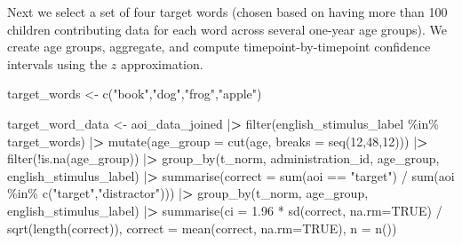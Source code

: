 \documentclass[
  english,
  man,floatsintext]{apa6}
\newenvironment{Shaded}{\begin{snugshade}}{\end{snugshade}}
\newcommand{\AttributeTok}[1]{\textcolor[rgb]{0.77,0.63,0.00}{#1}}
\newcommand{\ConstantTok}[1]{\textcolor[rgb]{0.00,0.00,0.00}{#1}}
\newcommand{\DecValTok}[1]{\textcolor[rgb]{0.00,0.00,0.81}{#1}}
\newcommand{\ErrorTok}[1]{\textcolor[rgb]{0.64,0.00,0.00}{\textbf{#1}}}
\newcommand{\FloatTok}[1]{\textcolor[rgb]{0.00,0.00,0.81}{#1}}
\newcommand{\FunctionTok}[1]{\textcolor[rgb]{0.00,0.00,0.00}{#1}}
\newcommand{\NormalTok}[1]{#1}
\newcommand{\OtherTok}[1]{\textcolor[rgb]{0.56,0.35,0.01}{#1}}
\newcommand{\SpecialCharTok}[1]{\textcolor[rgb]{0.00,0.00,0.00}{#1}}
\newcommand{\StringTok}[1]{\textcolor[rgb]{0.31,0.60,0.02}{#1}}
\begin{document}
Next we select a set of four target words (chosen based on having more than 100 children contributing data for each word across several one-year age groups).
We create age groups, aggregate, and compute timepoint-by-timepoint confidence intervals using the \(z\) approximation.

\begin{Shaded}
\begin{Highlighting}[]
\NormalTok{target\_words }\OtherTok{\textless{}{-}} \FunctionTok{c}\NormalTok{(}\StringTok{"book"}\NormalTok{,}\StringTok{"dog"}\NormalTok{,}\StringTok{"frog"}\NormalTok{,}\StringTok{"apple"}\NormalTok{)}

\NormalTok{target\_word\_data }\OtherTok{\textless{}{-}}\NormalTok{ aoi\_data\_joined }\SpecialCharTok{|}\ErrorTok{\textgreater{}}
  \FunctionTok{filter}\NormalTok{(english\_stimulus\_label }\SpecialCharTok{\%in\%}\NormalTok{ target\_words) }\SpecialCharTok{|}\ErrorTok{\textgreater{}}
  \FunctionTok{mutate}\NormalTok{(}\AttributeTok{age\_group =} \FunctionTok{cut}\NormalTok{(age, }\AttributeTok{breaks =} \FunctionTok{seq}\NormalTok{(}\DecValTok{12}\NormalTok{,}\DecValTok{48}\NormalTok{,}\DecValTok{12}\NormalTok{))) }\SpecialCharTok{|}\ErrorTok{\textgreater{}}
  \FunctionTok{filter}\NormalTok{(}\SpecialCharTok{!}\FunctionTok{is.na}\NormalTok{(age\_group)) }\SpecialCharTok{|}\ErrorTok{\textgreater{}}
  \FunctionTok{group\_by}\NormalTok{(t\_norm, administration\_id, age\_group, english\_stimulus\_label) }\SpecialCharTok{|}\ErrorTok{\textgreater{}} 
  \FunctionTok{summarise}\NormalTok{(}\AttributeTok{correct =} \FunctionTok{sum}\NormalTok{(aoi }\SpecialCharTok{==} \StringTok{"target"}\NormalTok{) }\SpecialCharTok{/} 
              \FunctionTok{sum}\NormalTok{(aoi }\SpecialCharTok{\%in\%} \FunctionTok{c}\NormalTok{(}\StringTok{"target"}\NormalTok{,}\StringTok{"distractor"}\NormalTok{))) }\SpecialCharTok{|}\ErrorTok{\textgreater{}}
  \FunctionTok{group\_by}\NormalTok{(t\_norm, age\_group, english\_stimulus\_label) }\SpecialCharTok{|}\ErrorTok{\textgreater{}} 
  \FunctionTok{summarise}\NormalTok{(}\AttributeTok{ci =} \FloatTok{1.96} \SpecialCharTok{*} \FunctionTok{sd}\NormalTok{(correct, }\AttributeTok{na.rm=}\ConstantTok{TRUE}\NormalTok{) }\SpecialCharTok{/} \FunctionTok{sqrt}\NormalTok{(}\FunctionTok{length}\NormalTok{(correct)), }
            \AttributeTok{correct =} \FunctionTok{mean}\NormalTok{(correct, }\AttributeTok{na.rm=}\ConstantTok{TRUE}\NormalTok{), }
            \AttributeTok{n =} \FunctionTok{n}\NormalTok{()) }
\end{Highlighting}
\end{Shaded}
\end{document}
